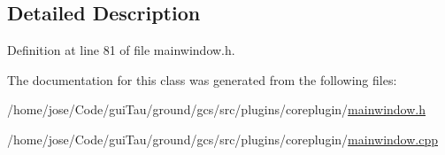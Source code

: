 \subsection{Detailed Description}


Definition at line 81 of file mainwindow.\-h.



The documentation for this class was generated from the following files\-:\begin{DoxyCompactItemize}
\item 
/home/jose/\-Code/gui\-Tau/ground/gcs/src/plugins/coreplugin/\hyperlink{plugins_2coreplugin_2mainwindow_8h}{mainwindow.\-h}\item 
/home/jose/\-Code/gui\-Tau/ground/gcs/src/plugins/coreplugin/\hyperlink{plugins_2coreplugin_2mainwindow_8cpp}{mainwindow.\-cpp}\end{DoxyCompactItemize}
